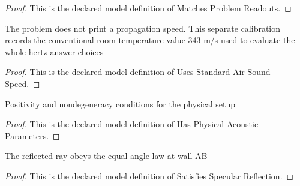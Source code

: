 \begin{proof}
  This is the declared model definition of Matches Problem Readouts.
\end{proof}
\begin{definition}
  \label{def:physics:phyx-mini-0330:phyxminiproblems-problemphyxmini0330-usesstandardairsoundspeed}
  The problem does not print a propagation speed. This separate calibration records the conventional room-temperature value 343 m/s used to evaluate the whole-hertz answer choices
\end{definition}
\begin{proof}
  This is the declared model definition of Uses Standard Air Sound Speed.
\end{proof}
\begin{definition}
  \label{def:physics:phyx-mini-0330:phyxminiproblems-problemphyxmini0330-hasphysicalacousticparameters}
  Positivity and nondegeneracy conditions for the physical setup
\end{definition}
\begin{proof}
  This is the declared model definition of Has Physical Acoustic Parameters.
\end{proof}
\begin{definition}
  \label{def:physics:phyx-mini-0330:phyxminiproblems-problemphyxmini0330-satisfiesspecularreflection}
  The reflected ray obeys the equal-angle law at wall AB
\end{definition}
\begin{proof}
  This is the declared model definition of Satisfies Specular Reflection.
\end{proof}
